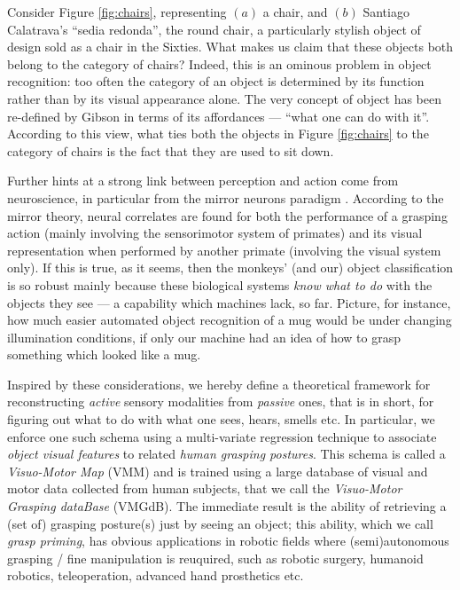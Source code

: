 Consider Figure \ref{fig:chairs}, representing $(a)$ a chair, and $(b)$ Santiago
Calatrava's ``sedia redonda'', the round chair, a particularly stylish object of
design sold as a chair in the Sixties. What makes us claim that these objects
both belong to the category of chairs? Indeed, this is an ominous problem in
object recognition: too often the category of an object is determined by its
function rather than by its visual appearance alone. The very concept of object
has been re-defined by Gibson \cite{gibson} in terms of its affordances ---
``what one can do with it''. According to this view, what ties both the objects in
Figure \ref{fig:chairs} to the category of chairs is the fact that they are
used to sit down.

Further hints at a strong link between perception and action come from neuroscience,
in particular from the mirror neurons paradigm \cite{fadiga}. According to the
mirror theory, neural correlates are found for both the performance of a grasping
action (mainly involving the sensorimotor system of primates) and its visual
representation when performed by another primate (involving the visual system only).
If this is true, as it seems, then the monkeys' (and our) object classification is
so robust mainly because these biological systems \emph{know what to do} with the
objects they see --- a capability which machines lack, so far. Picture, for instance,
how much easier automated object recognition of a mug would be under changing illumination
conditions, if only our machine had an idea of how to grasp something which looked like
a mug.

Inspired by these considerations, we hereby define a theoretical framework for
reconstructing \emph{active} sensory modalities from \emph{passive} ones, that is in
short, for figuring out what to do with what one sees, hears, smells etc. In particular,
we enforce one such schema using a multi-variate regression technique to associate
\emph{object visual features} to related \emph{human grasping postures}. This schema is
called a \emph{Visuo-Motor Map} (VMM) and is trained
using a large database of visual and motor data collected from human subjects, that
we call the \emph{Visuo-Motor Grasping dataBase} (VMGdB). The immediate result is the
ability of retrieving a (set of) grasping posture(s) just by seeing an object; this
ability, which we call \emph{grasp priming}, has obvious applications in robotic fields
where (semi)autonomous grasping / fine manipulation is reuquired, such as robotic surgery,
humanoid robotics, teleoperation, advanced hand prosthetics etc.

